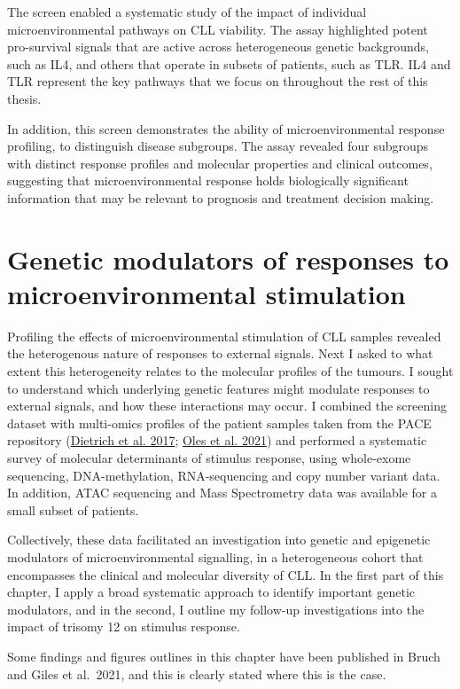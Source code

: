 \documentclass[11pt, a4paper, twosided]{book}
\begin{document}
The screen enabled a systematic study of the impact of individual microenvironmental pathways on CLL viability. The assay highlighted potent pro-survival signals that are active across heterogeneous genetic backgrounds, such as IL4, and others that operate in subsets of patients, such as TLR. IL4 and TLR represent the key pathways that we focus on throughout the rest of this thesis.

In addition, this screen demonstrates the ability of microenvironmental response profiling, to distinguish disease subgroups. The assay revealed four subgroups with distinct response profiles and molecular properties and clinical outcomes, suggesting that microenvironmental response holds biologically significant information that may be relevant to prognosis and treatment decision making.

\hypertarget{chapter5}{%
\chapter{Genetic modulators of responses to microenvironmental stimulation}\label{chapter5}}

Profiling the effects of microenvironmental stimulation of CLL samples revealed the heterogenous nature of responses to external signals. Next I asked to what extent this heterogeneity relates to the molecular profiles of the tumours. I sought to understand which underlying genetic features might modulate responses to external signals, and how these interactions may occur. I combined the screening dataset with multi-omics profiles of the patient samples taken from the PACE repository (\protect\hyperlink{ref-JCIpaper}{Dietrich et al. 2017}; \protect\hyperlink{ref-R-BloodCancerMultiOmics2017}{Oles et al. 2021}) and performed a systematic survey of molecular determinants of stimulus response, using whole-exome sequencing, DNA-methylation, RNA-sequencing and copy number variant data. In addition, ATAC sequencing and Mass Spectrometry data was available for a small subset of patients.

Collectively, these data facilitated an investigation into genetic and epigenetic modulators of microenvironmental signalling, in a heterogeneous cohort that encompasses the clinical and molecular diversity of CLL. In the first part of this chapter, I apply a broad systematic approach to identify important genetic modulators, and in the second, I outline my follow-up investigations into the impact of trisomy 12 on stimulus response.

Some findings and figures outlines in this chapter have been published in Bruch and Giles et al.~2021, and this is clearly stated where this is the case.
\end{document}
